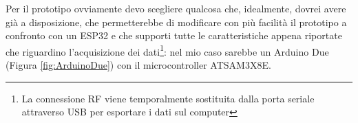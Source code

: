 \documentclass[a4paper, 10pt, final]{article} %
\begin{document}
        

    Per il prototipo ovviamente devo scegliere qualcosa che, idealmente, dovrei avere gi\`{a} a disposizione, che permetterebbe di modificare con pi\`{u} facilit\`{a} il prototipo a confronto con un ESP32 e che supporti tutte le caratteristiche appena riportate che riguardino l'acquisizione dei dati\footnote{La connessione RF viene temporalmente sostituita dalla porta seriale attraverso USB per esportare i dati sul computer}: nel mio caso sarebbe un Arduino Due (Figura \ref{fig:ArduinoDue}) con il microcontroller ATSAM3X8E.
\end{document}
